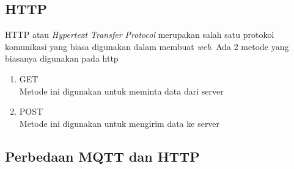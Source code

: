 \documentclass{class}
\begin{document}
  \subsection{HTTP}
  HTTP atau \emph{Hypertext Transfer Protocol} merupakan salah satu protokol komunikasi yang biasa digunakan dalam membuat \emph{web}.
  Ada 2 metode yang biasanya digunakan pada http 
  \begin{enumerate}
    \item GET \\
    Metode ini digunakan untuk meminta data dari server
    \item POST \\
    Metode ini digunakan untuk mengirim data ke server
  \end{enumerate}
  \subsection{Perbedaan MQTT dan HTTP}
\end{document}
